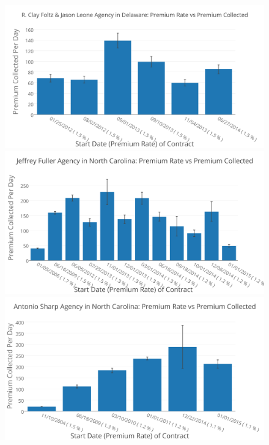 \documentclass{article}
\begin{document}
\begin{figure}[H]
\centering
\includegraphics[width=0.34\paperwidth]{R_Clay_Foltz_&_Jason_Leone_Agency_in_Delaware-_Premium_Rate_vs_Premium_Collected.png}\\
\includegraphics[width=0.34\paperwidth]{Jeffrey_Fuller_Agency_in_North_Carolina-_Premium_Rate_vs_Premium_Collected.png}
\includegraphics[width=0.34\paperwidth]{Antonio_Sharp_Agency_in_North_Carolina-_Premium_Rate_vs_Premium_Collected.png}
\end{figure}
\end{document}
